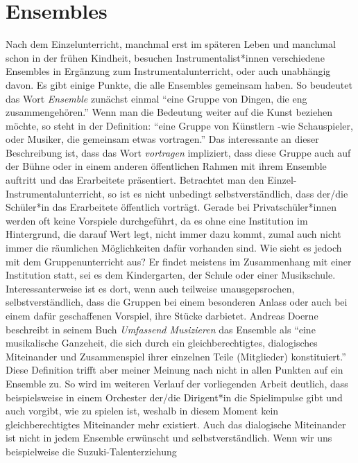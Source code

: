 \section{Ensembles}

Nach dem Einzelunterricht, manchmal erst im späteren Leben und manchmal schon in
der frühen Kindheit, besuchen Instrumentalist*innen verschiedene Ensembles in
Ergänzung zum Instrumentalunterricht, oder auch unabhängig davon. Es gibt einige
Punkte, die alle Ensembles gemeinsam haben. So beudeutet das Wort
\emph{Ensemble} zunächst einmal \enquote{eine Gruppe von Dingen, die eng
zusammengehören.}\autocite{wikipedia:gruppe} Wenn man die Bedeutung weiter auf
die Kunst beziehen möchte, so steht in der Definition: \enquote{eine Gruppe von
Künstlern -wie Schauspieler, oder Musiker, die gemeinsam etwas vortragen.}
\autocite{wikipedia:gruppe} Das interessante an dieser Beschreibung ist, dass
das Wort \emph{vortragen} impliziert, dass diese Gruppe auch auf der Bühne oder
in einem anderen öffentlichen Rahmen mit ihrem Ensemble auftritt und das
Erarbeitete präsentiert. Betrachtet man den Einzel- Instrumentalunterricht, so
ist es nicht unbedingt selbstverständlich, dass der/die Schüler*in das
Erarbeitete öffentlich vorträgt. Gerade bei Privatschüler*innen werden oft keine
Vorspiele durchgeführt, da es ohne eine Institution im Hintergrund, die darauf
Wert legt, nicht immer dazu kommt, zumal auch nicht immer die räumlichen
Möglichkeiten dafür vorhanden sind. Wie sieht es jedoch mit dem
Gruppenunterricht aus? Er findet meistens im Zusammenhang mit einer
Institution statt, sei es dem Kindergarten, der Schule oder einer Musikschule.
Interessanterweise ist es dort, wenn auch teilweise unausgepsrochen,
selbstverständlich, dass die Gruppen bei einem besonderen Anlass oder auch bei
einem dafür geschaffenen Vorspiel, ihre Stücke darbietet. Andreas Doerne
beschreibt in seinem Buch \emph{Umfassend Musizieren} das Ensemble als
\enquote{eine musikalische Ganzeheit, die sich durch ein gleichberechtigtes,
dialogisches Miteinander und Zusammenspiel ihrer einzelnen Teile (Mitglieder)
konstituiert.} \autocite[62]{doerne:umfassend_musizieren} Diese Definition
trifft aber meiner Meinung nach nicht in allen Punkten auf ein Ensemble zu. So
wird im weiteren Verlauf der vorliegenden Arbeit deutlich, dass beispielsweise in einem Orchester der/die
Dirigent*in die Spielimpulse gibt und auch vorgibt, wie zu spielen ist,
weshalb in diesem Moment kein gleichberechtigtes Miteinander mehr existiert. Auch
das dialogische Miteinander ist nicht in jedem Ensemble erwünscht und
selbstverständlich. Wenn wir uns beispielweise die Suzuki-Talenterziehung
